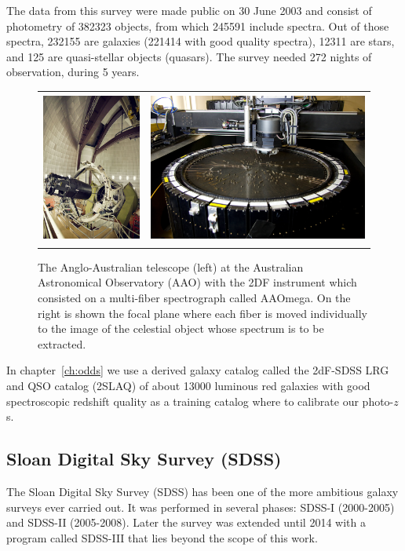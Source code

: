 The data from this survey were made public on 30 June 2003 and consist of photometry of 382323 objects, from which 245591 include spectra. Out of those spectra, 232155 are galaxies (221414 with good quality spectra), 12311 are stars, and 125 are quasi-stellar objects (quasars). The survey needed 272 nights of observation, during 5 years. 
\begin{figure}
\centering
\begin{tabular}{rl}
\includegraphics[height=50mm]{./plots/2df_camera.jpg} & \includegraphics[height=50mm]{./plots/2df_spectrograph.jpg} \\
\end{tabular}
\caption{The Anglo-Australian telescope (left) at the Australian Astronomical Observatory (AAO) with the 2DF instrument which consisted on a multi-fiber spectrograph called AAOmega. On the right is shown the focal plane where each fiber is moved individually to the image of the celestial object whose spectrum is to be extracted.}
\label{fig:2df_survey}
\end{figure}

In chapter~\ref{ch:odds} we use a derived galaxy catalog called the 2dF-SDSS LRG and QSO catalog (2SLAQ) \citep{Cannon2006} of about 13000 luminous red galaxies with good spectroscopic redshift quality as a training catalog where to calibrate our photo-$z$s.

\subsection{Sloan Digital Sky Survey (SDSS)}
\label{sec:sdss}
The Sloan Digital Sky Survey (SDSS) \citep{York2000} has been one of the more ambitious galaxy surveys ever carried out. It was performed in several phases: SDSS-I (2000-2005) and SDSS-II (2005-2008). Later the survey was extended until 2014 with a program called SDSS-III that lies beyond the scope of this work.

